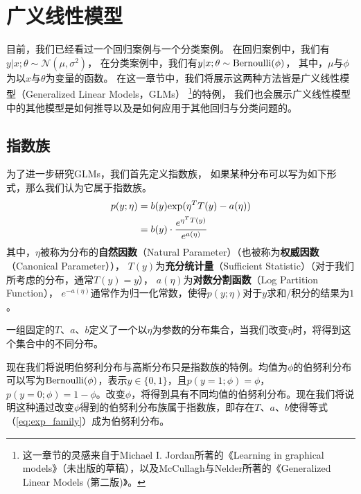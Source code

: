 \chapter{广义线性模型}

目前，我们已经看过一个回归案例与一个分类案例。
在回归案例中，我们有$y|x;\theta \sim \mathcal{N}(\mu,\sigma^2)$，
在分类案例中，我们有$y|x;\theta \sim {\rm Bernoulli}(\phi)$，
其中，$\mu$与$\phi$为以$x$与$\theta$为变量的函数。
在这一章节中，我们将展示这两种方法皆是广义线性模型（Generalized Linear Models，GLMs）
\footnote{这一章节的灵感来自于Michael I. Jordan所著的《Learning in graphical models》（未出版的草稿），以及McCullagh与Nelder所著的《Generalized Linear Models (第二版)》。}的特例，
我们也会展示广义线性模型中的其他模型是如何推导以及是如何应用于其他回归与分类问题的。

\section{指数族}

为了进一步研究GLMs，我们首先定义指数族，
如果某种分布可以写为如下形式，那么我们认为它属于指数族。
\begin{equation}
  \begin{aligned}
    p(y;\eta) & = b(y){\rm exp}(\eta^T T(y) - a(\eta))           \\
              & = b(y) \cdot \frac{e^{\eta^T T(y)}}{e^{a(\eta)}}
  \end{aligned}
  \label{eq:exp_family}
\end{equation}
其中，$\eta$被称为分布的\textbf{自然因数}（Natural Parameter）（也被称为\textbf{权威因数}（Canonical Parameter）），
$T(y)$为\textbf{充分统计量}（Sufficient Statistic）（对于我们所考虑的分布，通常$T(y)=y$），
$a(\eta)$为\textbf{对数分割函数}（Log Partition Function），
$e^{-a(\eta)}$通常作为归一化常数，使得$p(y;\eta)$对于$y$求和/积分的结果为$1$。

一组固定的$T$、$a$、$b$定义了一个以$\eta$为参数的分布集合，当我们改变$\eta$时，将得到这个集合中的不同分布。

现在我们将说明伯努利分布与高斯分布只是指数族的特例。均值为$\phi$的伯努利分布可以写为${\rm Bernoulli}(\phi)$，表示$y \in \{0,1\}$，且$p(y=1;\phi)=\phi$，$p(y=0;\phi)=1-\phi$。改变$\phi$，将得到具有不同均值的伯努利分布。现在我们将说明这种通过改变$\phi$得到的伯努利分布族属于指数族，即存在$T$、$a$、$b$使得等式（\ref{eq:exp_family}）成为伯努利分布。

